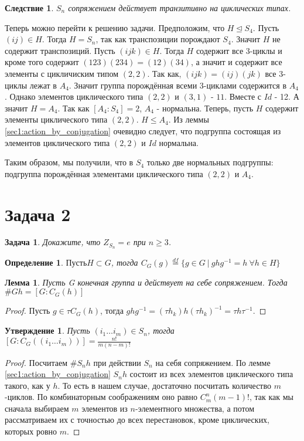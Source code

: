 \documentclass{article}
\newtheorem{task}{Задача}
\newtheorem{df}{Определение}
\newtheorem{lemma}{Лемма}
\newtheorem{cq}{Следствие}
\newtheorem{statement}{Утверждение}
\newcommand{\icycle}[3]{(#1_{#2} \dots #1_{#3})}
\newcommand{\ad}[2]{#1#2#1^{-1}}
\newcommand{\dfeq}{\overset{df}{=}}
\newcommand{\normalin}{\trianglelefteq}
\newcommand{\subgroup}{\leq}
\begin{document}
\begin{cq}
$S_n$ сопряжением действует транзитивно на циклических типах.
\end{cq}
Теперь можно перейти к решению задачи. 
Предположим, что $H \normalin S_4$.
Пусть $(ij) \in H$. Тогда $H = S_n$, так как транспозиции порождают $S_4$.
Значит $H$ не содержит транспозиций. 
Пусть $(ijk) \in H$. Тогда $H$ содержит все 3-циклы и кроме того содержит  
$(123)(234) = (12)(34)$, а значит и содержит все элементы с цикличиским типом $(2, 2)$.
Так как, $(ijk) = (ij)(jk)$ все 3-циклы лежат в $A_4$. 
Значит группа порождённая всеми 3-циклами содержится в $A_4$.
Однако элементов циклического типа $(2, 2)$ и $(3, 1)$ - $11$. Вместе с $Id$ - 12.
А значит $H = A_4$. Так как $[A_4: S_4] = 2$, $A_4$ - нормальна.
Теперь, пусть $H$ содержит элементы циклического типа $(2, 2)$. $H \subgroup A_4$. 
Из леммы \ref{sec1:action_by_conjugation} очевидно следует, что подгруппа состоящая из элементов циклического типа $(2, 2)$ и $Id$ нормальна.

Таким образом, мы получили, что в $S_4$ только две нормальных подгруппы: подгруппа порождённая элементами циклического типа $(2, 2)$ и $A_4$.


\section*{Задача 2}

\begin{task}
Докажите, что $Z_{S_n} = {e}$ при $n \geq 3$.
\end{task}

\begin{df}
    $Пусть H \subset G$, тогда $C_G(g) \dfeq \{g \in G ~ | ~ \ad{g}{h} = h ~ \forall h \in H\}$
\end{df}

\begin{lemma}
Пусть G конечная группа и действует на себе сопряжением.
Тогда $\#Gh = [G: C_{G}(h)]$ 
\end{lemma}

\begin{proof}
Пусть $g \in \tau C_{G}(h)$, тогда $\ad{g}{h} = \ad{(\tau h_k)}{h} = \ad{\tau}{h}$.
\end{proof}

\begin{statement}
Пусть $\icycle{i}{1}{m} \in S_n$, тогда $[G: C_G(\icycle{i}{1}{m})] = \frac{n!}{m(n - m)!}$
\end{statement}

\begin{proof}
Посчитаем $\#S_{n}h$ при действии $S_n$ на себя сопряжением.
По лемме \ref{sec1:action_by_conjugation} $S_{n}h$ состоит из всех элементов циклического типа такого, как у $h$.
То есть в нашем случае, достаточно посчитать количество $m$-циклов.
По комбинаторным соображениям оно равно $C^{n}_{m} (m - 1)!$, 
так как мы сначала выбираем $m$ элементов из $n$-элементного множества, 
а потом рассматриваем их с точностью до всех перестановок, кроме циклических, которых ровно $m$.
\end{proof}
\end{document}
